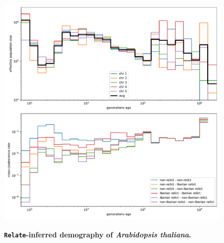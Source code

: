 \documentclass[12pt]{article}
\begin{document}
\begin{figure}[!htb]

\includegraphics[width=\textwidth]{effective-population-sizes.pdf}

\caption{
\textbf{\texttt{Relate}-inferred demography of \textit{Arabidopsis thaliana}.}
}

\label{fig:nes}
\end{figure}
\end{document}
